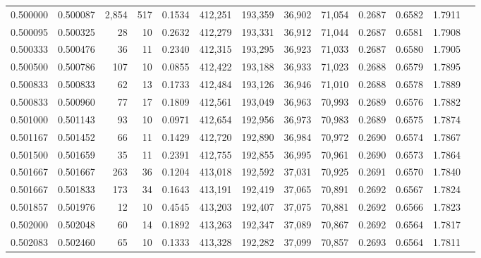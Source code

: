 \begin{tabular}{rrrrrrrrrrrrr}
0.500000 & 0.500087 & 2,854 & 517 &                                     0.1534 & 412,251 & 193,359 &  36,902 &  71,054 & 0.2687 & 0.6582 & 1.7911 \\
0.500095 & 0.500325 &    28 &  10 &                                     0.2632 & 412,279 & 193,331 &  36,912 &  71,044 & 0.2687 & 0.6581 & 1.7908 \\
0.500333 & 0.500476 &    36 &  11 &                                     0.2340 & 412,315 & 193,295 &  36,923 &  71,033 & 0.2687 & 0.6580 & 1.7905 \\
0.500500 & 0.500786 &   107 &  10 &                                     0.0855 & 412,422 & 193,188 &  36,933 &  71,023 & 0.2688 & 0.6579 & 1.7895 \\
0.500833 & 0.500833 &    62 &  13 &                                     0.1733 & 412,484 & 193,126 &  36,946 &  71,010 & 0.2688 & 0.6578 & 1.7889 \\
0.500833 & 0.500960 &    77 &  17 &                                     0.1809 & 412,561 & 193,049 &  36,963 &  70,993 & 0.2689 & 0.6576 & 1.7882 \\
0.501000 & 0.501143 &    93 &  10 &                                     0.0971 & 412,654 & 192,956 &  36,973 &  70,983 & 0.2689 & 0.6575 & 1.7874 \\
0.501167 & 0.501452 &    66 &  11 &                                     0.1429 & 412,720 & 192,890 &  36,984 &  70,972 & 0.2690 & 0.6574 & 1.7867 \\
0.501500 & 0.501659 &    35 &  11 &                                     0.2391 & 412,755 & 192,855 &  36,995 &  70,961 & 0.2690 & 0.6573 & 1.7864 \\
0.501667 & 0.501667 &   263 &  36 &                                     0.1204 & 413,018 & 192,592 &  37,031 &  70,925 & 0.2691 & 0.6570 & 1.7840 \\
0.501667 & 0.501833 &   173 &  34 &                                     0.1643 & 413,191 & 192,419 &  37,065 &  70,891 & 0.2692 & 0.6567 & 1.7824 \\
0.501857 & 0.501976 &    12 &  10 &                                     0.4545 & 413,203 & 192,407 &  37,075 &  70,881 & 0.2692 & 0.6566 & 1.7823 \\
0.502000 & 0.502048 &    60 &  14 &                                     0.1892 & 413,263 & 192,347 &  37,089 &  70,867 & 0.2692 & 0.6564 & 1.7817 \\
0.502083 & 0.502460 &    65 &  10 &                                     0.1333 & 413,328 & 192,282 &  37,099 &  70,857 & 0.2693 & 0.6564 & 1.7811 \\

\end{tabular}
